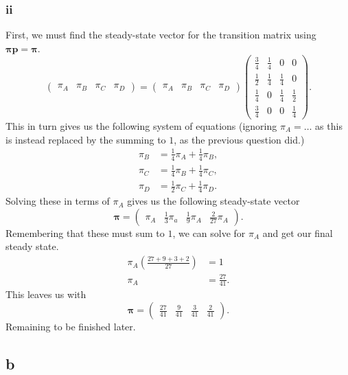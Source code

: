 \documentclass{article}
\begin{document}
\subsubsection{ii}
First, we must find the steady-state vector for the transition matrix using $\boldsymbol{\pi}\mathbf{p} = \boldsymbol{\pi}$.
\begin{equation}
    \begin{pmatrix}
        \pi_A & \pi_B & \pi_C & \pi_D
    \end{pmatrix} = \begin{pmatrix}
        \pi_A & \pi_B & \pi_C & \pi_D
    \end{pmatrix}\begin{pmatrix}
        \frac{3}{4} & \frac{1}{4} & 0 & 0 \\
        \frac{1}{2} & \frac{1}{4} & \frac{1}{4} & 0 \\
        \frac{1}{4} & 0 & \frac{1}{4} & \frac{1}{2} \\
        \frac{3}{4} & 0 & 0 & \frac{1}{4}
    \end{pmatrix}.
\end{equation}
This in turn gives us the following system of equations (ignoring $\pi_A=\ldots$ as this is instead replaced by the summing to $1$, as the previous question did.)
\begin{align}
    \pi_B &= \frac{1}{4}\pi_A + \frac{1}{4}\pi_B, \\
    \pi_C &= \frac{1}{4}\pi_B + \frac{1}{4}\pi_C, \\
    \pi_D &= \frac{1}{2}\pi_C + \frac{1}{4}\pi_D.
\end{align}
Solving these in terms of $\pi_A$ gives us the following steady-state vector
\begin{equation}
    \boldsymbol{\pi} = \begin{pmatrix}
        \pi_A & \frac{1}{3}\pi_a & \frac{1}{9}\pi_A & \frac{2}{27}\pi_A
    \end{pmatrix}.
\end{equation}
Remembering that these must sum to $1$, we can solve for $\pi_A$ and get our final steady state.
\begin{align}
    \pi_A\left( \frac{27 + 9 + 3 + 2}{27} \right) &= 1 \\
    \pi_A &= \frac{27}{41}. 
\end{align}
This leaves us with
\begin{equation}
    \boldsymbol{\pi} = \begin{pmatrix}
        \frac{27}{41} & \frac{9}{41} & \frac{3}{41} & \frac{2}{41}
    \end{pmatrix}.
\end{equation}
Remaining to be finished later.

\subsection{b}
\end{document}
